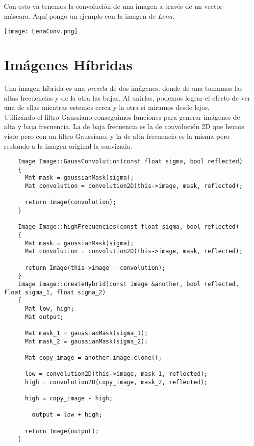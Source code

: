 \documentclass[a4paper, 11pt]{article}
\theoremstyle{definition}
\begin{document}
  Con esto ya tenemos la convolución de una imagen a través de un vector máscara.
  Aquí pongo un ejemplo con la imagen de \textit{Lena}.

  \centerline{\texttt{[image: LenaConv.png]}}


  \section{Imágenes Híbridas}

  Una imagen híbrida es una \textit{mezcla} de dos imágenes, donde de una tomamos las altas
  frecuencias y de la otra las bajas. Al unirlas, podemos lograr el efecto de
  ver una de ellas mientras estemos cerca y la otra si miramos desde lejos.\\

  Utilizando el filtro Gaussiano conseguimos funciones para generar imágenes de alta
  y baja frecuencia. La de baja frecuencia es la de convolución 2D que hemos visto
  pero con un filtro Gaussiano, y la de alta frecuencia es la misma pero restando
  a la imagen original la suavizada.

  \begin{lstlisting}
    Image Image::GaussConvolution(const float sigma, bool reflected)
    {
      Mat mask = gaussianMask(sigma);
      Mat convolution = convolution2D(this->image, mask, reflected);

      return Image(convolution);
    }

    Image Image::highFrecuencies(const float sigma, bool reflected)
    {
      Mat mask = gaussianMask(sigma);
      Mat convolution = convolution2D(this->image, mask, reflected);

      return Image(this->image - convolution);
    }
    Image Image::createHybrid(const Image &another, bool reflected, float sigma_1, float sigma_2)
    {
      Mat low, high;
      Mat output;

      Mat mask_1 = gaussianMask(sigma_1);
      Mat mask_2 = gaussianMask(sigma_2);

      Mat copy_image = another.image.clone();

      low = convolution2D(this->image, mask_1, reflected);
      high = convolution2D(copy_image, mask_2, reflected);

      high = copy_image - high;

    	output = low + high;

      return Image(output);
    }
  \end{lstlisting}
\end{document}
